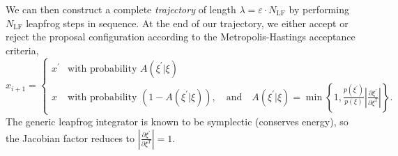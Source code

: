 \documentclass{article} %
\begin{document}
%
We can then construct a complete \emph{trajectory} of length \(\lambda = \varepsilon\cdot N_{\mathrm{LF}}\) by
performing \(N_{\mathrm{LF}}\) leapfrog steps in sequence.
%
At the end of our trajectory, we either accept or reject the proposal configuration according to the Metropolis-Hastings
acceptance criteria,
%
\begin{equation}
   x_{i+1} =
   \begin{cases}%
      x^{\prime} &\mbox{with probability } A(\xi^{\prime}|\xi) \\
      x &\mbox{with probability } (1 - A(\xi^{\prime}|\xi)), \quad\text{and}\quad%
         A(\xi^{\prime}|\xi) = \min\left\{%
            1, \frac{p(\xi^{\prime})}{p(\xi)}\left|\frac{\partial{\xi^{\prime}}}{\partial\xi^{T}}\right|%
         \right\}.
   \end{cases}
   \label{eq:mhcriteria}
\end{equation}
%
The generic leapfrog integrator is known to be symplectic (conserves energy), so the Jacobian factor reduces to
\(\left|\frac{\partial\xi^{\prime}}{\partial\xi^{T}}\right| = 1\). 
%
\end{document}
